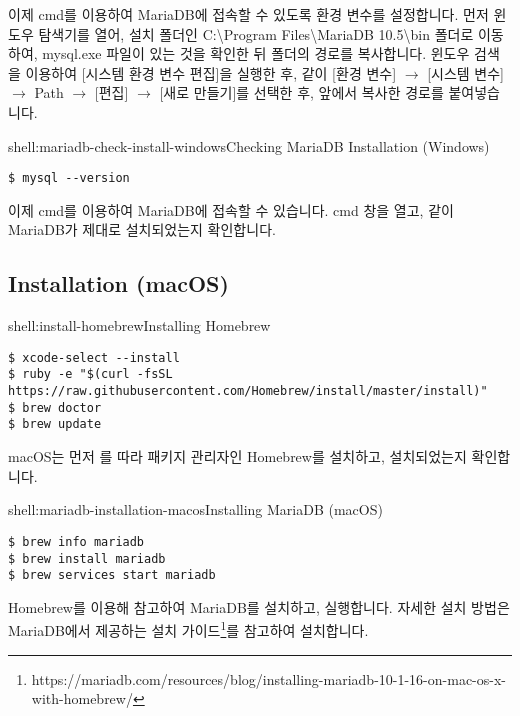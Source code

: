 
이제 cmd를 이용하여 MariaDB에 접속할 수 있도록 환경 변수를 설정합니다. 먼저 윈도우 탐색기를 열어, 설치 폴더인 C:\textbackslash{}Program Files\textbackslash{}MariaDB 10.5\textbackslash{}bin 폴더로 이동하여, mysql.exe 파일이 있는 것을 확인한 뒤 폴더의 경로를 복사합니다. 윈도우 검색을 이용하여 [시스템 환경 변수 편집]을 실행한 후, \과 같이 [환경 변수] $\rightarrow$ [시스템 변수] $\rightarrow$ Path $\rightarrow$ [편집] $\rightarrow$ [새로 만들기]를 선택한 후, 앞에서 복사한 경로를 붙여넣습니다.

\begin{shellenv}{shell:mariadb-check-install-windows}{Checking MariaDB Installation (Windows)}\begin{verbatim}
$ mysql --version
\end{verbatim}
\end{shellenv}

이제 cmd를 이용하여 MariaDB에 접속할 수 있습니다. cmd 창을 열고, \와 같이 MariaDB가 제대로 설치되었는지 확인합니다.

\subsection*{Installation (macOS)}

\begin{shellenv}{shell:install-homebrew}{Installing Homebrew}\begin{verbatim}
$ xcode-select --install
$ ruby -e "$(curl -fsSL https://raw.githubusercontent.com/Homebrew/install/master/install)"
$ brew doctor
$ brew update
\end{verbatim}
\end{shellenv}

macOS는 먼저 를 따라 패키지 관리자인 Homebrew를 설치하고, 설치되었는지 확인합니다.

\begin{shellenv}{shell:mariadb-installation-macos}{Installing MariaDB (macOS)}\begin{verbatim}
$ brew info mariadb
$ brew install mariadb
$ brew services start mariadb
\end{verbatim}
\end{shellenv}

Homebrew를 이용해 \를 참고하여 MariaDB를 설치하고, 실행합니다. 자세한 설치 방법은 MariaDB에서 제공하는 설치 가이드\footnote{https://mariadb.com/resources/blog/installing-mariadb-10-1-16-on-mac-os-x-with-homebrew/}를 참고하여 설치합니다.

